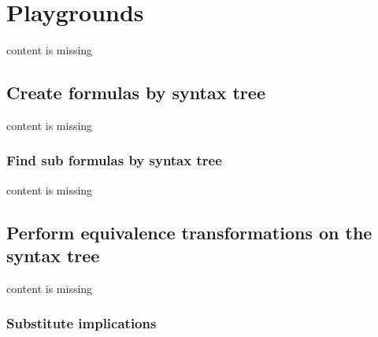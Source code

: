 




\section{Playgrounds}

content is missing

\subsection{Create formulas by syntax tree}

content is missing

\subsubsection{Find sub formulas by syntax tree}

content is missing

\subsection{Perform equivalence transformations on the syntax tree}

content is missing

\subsubsection{Substitute implications}

